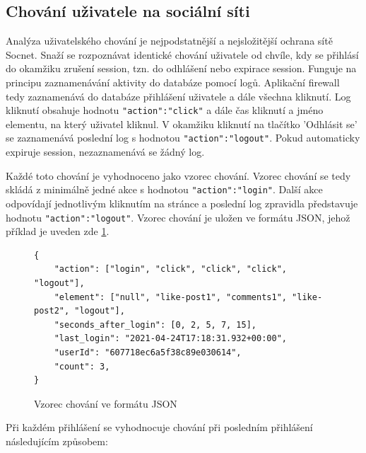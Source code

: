 \subsection*{Chování uživatele na sociální síti}
Analýza uživatelského chování je nejpodstatnější a nejsložitější ochrana sítě Socnet. Snaží se rozpoznávat identické chování uživatele od chvíle, kdy se přihlásí do okamžiku zrušení session, tzn. do odhlášení nebo expirace session. Funguje na principu zaznamenávání aktivity do databáze pomocí logů. Aplikační firewall tedy zaznamenává do databáze přihlášení uživatele a dále všechna kliknutí. Log kliknutí obsahuje hodnotu \texttt{"action":"click"} a dále čas kliknutí a jméno elementu, na který uživatel kliknul. V okamžiku kliknutí na tlačítko 'Odhlásit se' se zaznamenává poslední log s hodnotou \texttt{"action":"logout"}. Pokud automaticky expiruje session, nezaznamenává se žádný log.

Každé toto chování je vyhodnoceno jako vzorec chování. Vzorec chování se tedy skládá z minimálně jedné akce s hodnotou \texttt{"action":"login"}. Další akce odpovídají jednotlivým kliknutím na stránce a poslední log zpravidla představuje hodnotu \texttt{"action":"logout"}. Vzorec chování je uložen ve formátu JSON, jehož příklad je uveden zde \ref{json:behaviour_pattern}.

\begin{figure}[H]
    \centering
    \begin{verbatim}
{   
    "action": ["login", "click", "click", "click", "logout"],
    "element": ["null", "like-post1", "comments1", "like-post2", "logout"],
    "seconds_after_login": [0, 2, 5, 7, 15],
    "last_login": "2021-04-24T17:18:31.932+00:00",
    "userId": "607718ec6a5f38c89e030614",
    "count": 3,
}
    \end{verbatim}
    \caption{Vzorec chování ve formátu JSON}
    \label{json:behaviour_pattern}
\end{figure}
\bigskip

Při každém přihlášení se vyhodnocuje chování při posledním přihlášení následujícím způsobem:

